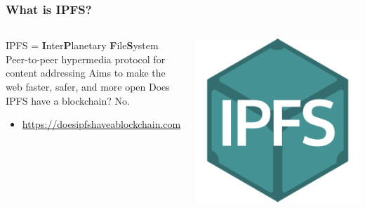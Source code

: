 \documentclass{../shipyard-slide}
\begin{document}
\begin{frame}
\frametitle{What is IPFS?}
\begin{columns}
  \begin{column}{.7\linewidth}
  \begin{itemize}
    \itemc IPFS = \textbf{I}nter\textbf{P}lanetary \textbf{F}ile\textbf{S}ystem
    \itemc Peer-to-peer hypermedia protocol for content addressing
    \itemc Aims to make the web faster, safer, and more open
    \itemc Does IPFS have a blockchain? No.
    \begin{itemize}
      \item \url{https://doesipfshaveablockchain.com}
    \end{itemize}
  \end{itemize}
\end{column}
\begin{column}{.25\linewidth}
  \includegraphics[width=\linewidth]{resources/ipfs-logo.png}
\end{column}
\end{columns}
\end{frame}

%
\end{document}
